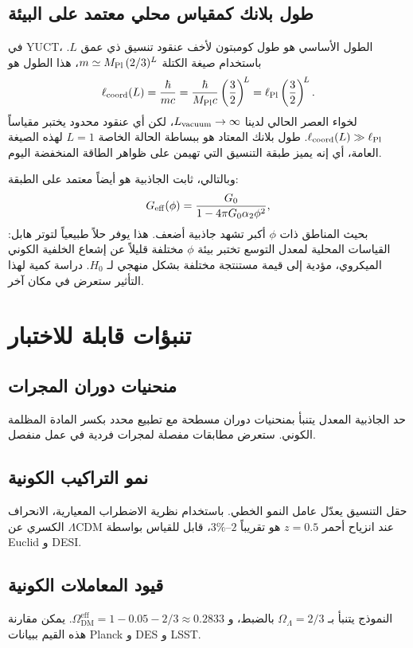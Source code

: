 \documentclass[12pt,a4paper]{article}
\begin{document}
	\subsection{طول بلانك كمقياس محلي معتمد على البيئة}
	في YUCT، الطول الأساسي هو طول كومبتون لأخف عنقود تنسيق ذي عمق \(L\). باستخدام صيغة الكتلة \(m \simeq M_{\rm Pl}\,(2/3)^L\)، هذا الطول هو
	\begin{equation}
		\ell_{\rm coord}(L) = \frac{\hbar}{m c}
		= \frac{\hbar}{M_{\rm Pl}c} \left(\frac{3}{2}\right)^{\!L}
		= \ell_{\rm Pl} \left(\frac{3}{2}\right)^{\!L}.
		\label{eq:length-from-L}
	\end{equation}
	لخواء العصر الحالي لدينا \(L_{\rm vacuum}\to\infty\)، لكن أي عنقود محدود يختبر مقياساً \(\ell_{\rm coord}(L) \gg \ell_{\rm Pl}\). طول بلانك المعتاد هو ببساطة الحالة الخاصة \(L=1\) لهذه الصيغة العامة، أي إنه يميز طبقة التنسيق التي تهيمن على ظواهر الطاقة المنخفضة اليوم.
	
	وبالتالي، ثابت الجاذبية هو أيضاً معتمد على الطبقة:
	\begin{equation}
		G_{\rm eff}(\phi) = \frac{G_0}{1-4\pi G_0\alpha_2\phi^2},
		\label{eq:Geff-layer}
	\end{equation}
	بحيث المناطق ذات \(\phi\) أكبر تشهد جاذبية أضعف. هذا يوفر حلاً طبيعياً لتوتر هابل: القياسات المحلية لمعدل التوسع تختبر بيئة \(\phi\) مختلفة قليلاً عن إشعاع الخلفية الكوني الميكروي، مؤدية إلى قيمة مستنتجة مختلفة بشكل منهجي لـ \(H_0\). دراسة كمية لهذا التأثير ستعرض في مكان آخر.
	
	\section{تنبؤات قابلة للاختبار}
	
	\subsection{منحنيات دوران المجرات}
	حد الجاذبية المعدل يتنبأ بمنحنيات دوران مسطحة مع تطبيع محدد بكسر المادة المظلمة الكوني. ستعرض مطابقات مفصلة لمجرات فردية في عمل منفصل.
	
	\subsection{نمو التراكيب الكونية}
	حقل التنسيق يعدّل عامل النمو الخطي. باستخدام نظرية الاضطراب المعيارية، الانحراف الكسري عن \(\Lambda\)CDM عند انزياح أحمر \(z=0.5\) هو تقريباً \(2\)--\(3\%\)، قابل للقياس بواسطة Euclid و DESI.
	
	\subsection{قيود المعاملات الكونية}
	النموذج يتنبأ بـ \(\Omega_\Lambda = 2/3\) بالضبط، و \(\Omega_{\mathrm{DM}}^{\mathrm{eff}} = 1 - 0.05 - 2/3 \approx 0.2833\). يمكن مقارنة هذه القيم ببيانات Planck و DES و LSST.
	
\end{document}
